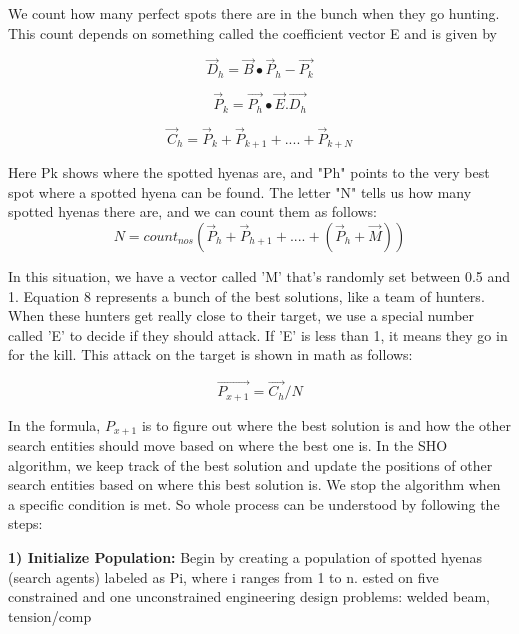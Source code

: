 \documentclass[12pt]{article}
\begin{document}
We count how many perfect spots there are in the bunch when they go hunting. This count depends on something called the coefficient vector E and is given by

\begin{equation}
    \overrightarrow{D}_h = \overrightarrow{B}\bullet \overrightarrow{P}_h-\overrightarrow{P_k}
\end{equation}

\begin{equation}
    \overrightarrow{P}_k = \overrightarrow{P_h}\bullet \overrightarrow{E}.\overrightarrow{D_h}
\end{equation}

\begin{equation}
    \overrightarrow{C}_h = \overrightarrow{P}_k + \overrightarrow{P}_{k+1}+ .... + \overrightarrow{P}_{k+N}
\end{equation}

Here Pk shows where the spotted hyenas are, and "Ph" points to the very best spot where a spotted hyena can be found. The letter "N" tells us how many spotted hyenas there are, and we can count them as follows:
\begin{equation}
    N  = count_{nos}(\overrightarrow{P}_h + \overrightarrow{P}_{h+1}+ .... + (\overrightarrow{P}_{h}+\overrightarrow{M}))
\end{equation}


In this situation, we have a vector called 'M' that's randomly set between 0.5 and 1. Equation 8 represents a bunch of the best solutions, like a team of hunters. When these hunters get really close to their target, we use a special number called 'E' to decide if they should attack. If 'E' is less than 1, it means they go in for the kill. This attack on the target is shown in math as follows:

\begin{equation}
    \overrightarrow{P_{x+1}}= \overrightarrow{C_h}/N 
\end{equation}


In the formula, $P_{x+1}$ 
is to figure out where the best solution is and how the other search entities should move based on where the best one is. 
In the SHO algorithm, we keep track of the best solution and update the positions of other search entities based on where this best solution is. We stop the algorithm when a specific condition is met. 
So whole process can be understood by following the steps:

\textbf{1) Initialize Population:} Begin by creating a population of spotted hyenas (search agents) labeled as Pi, where i ranges from 1 to n.
ested on five constrained and one unconstrained
engineering design problems: welded beam,
tension/comp
\end{document}
